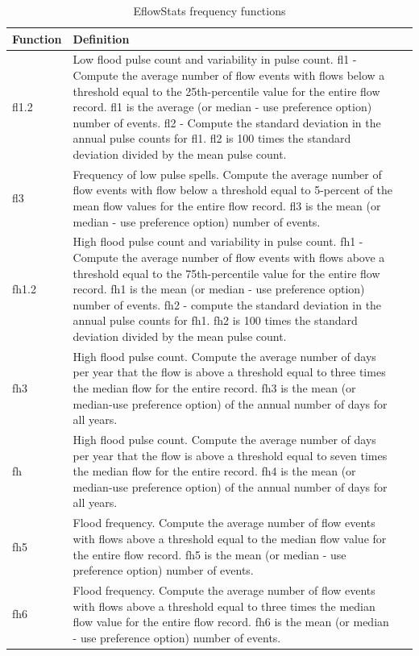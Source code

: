 \documentclass[a4paper,11pt]{article}\usepackage[]{graphicx}\usepackage[]{color}
\begin{document}
\begin{table}[ht]
  \centering
  \begin{threeparttable}[b]
  \caption{EflowStats frequency functions}
  \label{tab:freqStats}
\begin{tabularx}{\textwidth}{lXl}
  \hline
\textbf{Function} & \textbf{Definition} \\ 
  \hline
  fl1.2 & Low flood pulse count and variability in pulse count. fl1 - Compute the average number of flow events with flows below a threshold equal to the 25th-percentile value for the entire flow record. fl1 is the average (or median - use preference option) number of events. fl2 - Compute the standard deviation in the annual pulse counts for fl1. fl2 is 100 times the standard deviation divided by the mean pulse count. \\
  fl3 & Frequency of low pulse spells. Compute the average number of flow events with flow below a threshold equal to 5-percent of the mean flow values for the entire flow record. fl3 is the mean (or median - use preference option) number of events. \\
  fh1.2 & High flood pulse count and variability in pulse count. fh1 - Compute the average number of flow events with flows above a threshold equal to the 75th-percentile value for the entire flow record. fh1 is the mean (or median - use preference option) number of events. fh2 - compute the standard deviation in the annual pulse counts for fh1. fh2 is 100 times the standard deviation divided by the mean pulse count. \\
  fh3 & High flood pulse count. Compute the average number of days per year that the flow is above a threshold equal to three times the median flow for the entire record. fh3 is the mean (or median-use preference option) of the annual number of days for all years. \\
  fh & High flood pulse count. Compute the average number of days per year that the flow is above a threshold equal to seven times the median flow for the entire record. fh4 is the mean (or median-use preference option) of the annual number of days for all years. \\
  fh5 & Flood frequency. Compute the average number of flow events with flows above a threshold equal to the median flow value for the entire flow record. fh5 is the mean (or median - use preference option) number of events. \\
  fh6 & Flood frequency. Compute the average number of flow events with flows above a threshold equal to three times the median flow value for the entire flow record. fh6 is the mean (or median - use preference option) number of events. \\

\end{tabularx}
\end{threeparttable}
\end{table}
\end{document}
